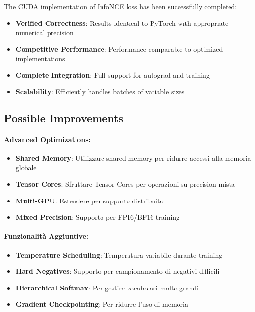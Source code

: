 \documentclass[a4paper,11pt]{article}
\begin{document}
The CUDA implementation of InfoNCE loss has been successfully completed:

\begin{itemize}
    \item \textbf{Verified Correctness}: Results identical to PyTorch with appropriate numerical precision
    \item \textbf{Competitive Performance}: Performance comparable to optimized implementations
    \item \textbf{Complete Integration}: Full support for autograd and training
    \item \textbf{Scalability}: Efficiently handles batches of variable sizes
\end{itemize}

\subsection{Possible Improvements}

\paragraph{Advanced Optimizations:}
\begin{itemize}
    \item \textbf{Shared Memory}: Utilizzare shared memory per ridurre accessi alla memoria globale
    \item \textbf{Tensor Cores}: Sfruttare Tensor Cores per operazioni su precision mista
    \item \textbf{Multi-GPU}: Estendere per supporto distribuito
    \item \textbf{Mixed Precision}: Supporto per FP16/BF16 training
\end{itemize}

\paragraph{Funzionalità Aggiuntive:}
\begin{itemize}
    \item \textbf{Temperature Scheduling}: Temperatura variabile durante training
    \item \textbf{Hard Negatives}: Supporto per campionamento di negativi difficili
    \item \textbf{Hierarchical Softmax}: Per gestire vocabolari molto grandi
    \item \textbf{Gradient Checkpointing}: Per ridurre l'uso di memoria
\end{itemize}
\end{document}

